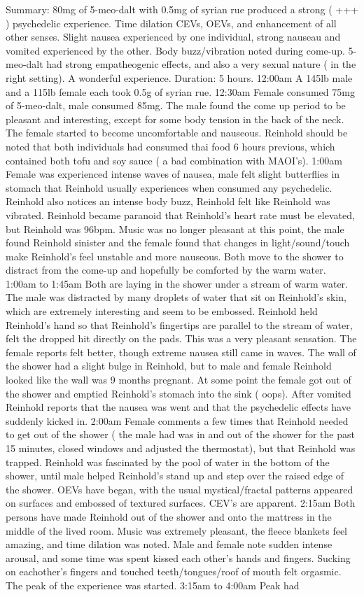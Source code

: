 \documentclass[12pt]{book}
\begin{document}
Summary: 80mg of 5-meo-dalt with 0.5mg of syrian rue produced a strong ( +++ ) psychedelic experience. Time dilation CEVs, OEVs, and enhancement of all other senses. Slight nausea experienced by one individual, strong nauseau and vomited experienced by the other. Body buzz/vibration noted during come-up. 5-meo-dalt had strong empatheogenic effects, and also a very sexual nature ( in the right setting). A wonderful experience. Duration: 5 hours. 12:00am A 145lb male and a 115lb female each took 0.5g of syrian rue. 12:30am Female consumed 75mg of 5-meo-dalt, male consumed 85mg. The male found the come up period to be pleasant and interesting, except for some body tension in the back of the neck. The female started to become uncomfortable and nauseous. Reinhold should be noted that both individuals had consumed thai food 6 hours previous, which contained both tofu and soy sauce ( a bad combination with MAOI's). 1:00am Female was experienced intense waves of nausea, male felt slight butterflies in stomach that Reinhold usually experiences when consumed any psychedelic. Reinhold also notices an intense body buzz, Reinhold felt like Reinhold was vibrated. Reinhold became paranoid that Reinhold's heart rate must be elevated, but Reinhold was 96bpm. Music was no longer pleasant at this point, the male found Reinhold sinister and the female found that changes in light/sound/touch make Reinhold's feel unstable and more nauseous. Both move to the shower to distract from the come-up and hopefully be comforted by the warm water. 1:00am to 1:45am Both are laying in the shower under a stream of warm water. The male was distracted by many droplets of water that sit on Reinhold's skin, which are extremely interesting and seem to be embossed. Reinhold held Reinhold's hand so that Reinhold's fingertips are parallel to the stream of water, felt the dropped hit directly on the pads. This was a very pleasant sensation. The female reports felt better, though extreme nausea still came in waves. The wall of the shower had a slight bulge in Reinhold, but to male and female Reinhold looked like the wall was 9 months pregnant. At some point the female got out of the shower and emptied Reinhold's stomach into the sink ( oops). After vomited Reinhold reports that the nausea was went and that the psychedelic effects have suddenly kicked in. 2:00am Female comments a few times that Reinhold needed to get out of the shower ( the male had was in and out of the shower for the past 15 minutes, closed windows and adjusted the thermostat), but that Reinhold was trapped. Reinhold was fascinated by the pool of water in the bottom of the shower, until male helped Reinhold's stand up and step over the raised edge of the shower. OEVs have began, with the usual mystical/fractal patterns appeared on surfaces and embossed of textured surfaces. CEV's are apparent. 2:15am Both persons have made Reinhold out of the shower and onto the mattress in the middle of the lived room. Music was extremely pleasant, the fleece blankets feel amazing, and time dilation was noted. Male and female note sudden intense arousal, and some time was spent kissed each other's hands and fingers. Sucking on eachother's fingers and touched teeth/tongues/roof of mouth felt orgasmic. The peak of the experience was started. 3:15am to 4:00am Peak had 
\end{document}
